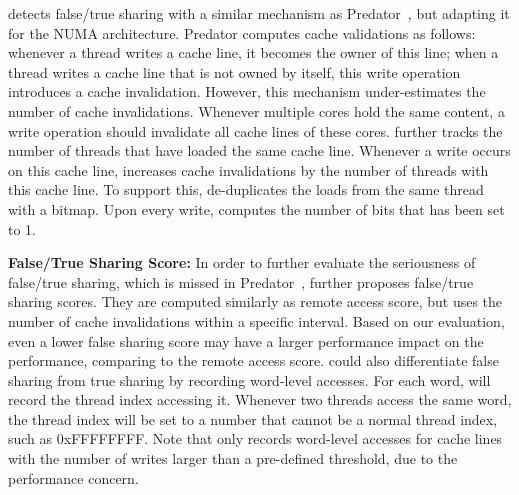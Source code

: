 \NP{} detects false/true sharing with a similar mechanism as Predator~\cite{Predator}, but adapting it for the NUMA architecture. Predator computes cache validations as follows: whenever a thread writes a cache line, it becomes the owner of this line; when a thread writes a cache line that is not owned by itself, this write operation introduces a cache invalidation. However, this mechanism under-estimates the number of cache invalidations. Whenever multiple cores hold the same content, a write operation should invalidate all cache lines of these cores. \NP{} further tracks the number of threads that have loaded the same cache line. Whenever a write occurs on this cache line, \NP{} increases cache invalidations by the number of threads with this cache line. To support this, \NP{} de-duplicates the loads from the same thread with a bitmap. Upon every write, \NP{} computes the number of bits that has been set to 1. 

\textbf{False/True Sharing Score:} In order to further evaluate the seriousness of false/true sharing, which is missed in Predator~\cite{Predator}, \NP{} further proposes false/true sharing scores. They are computed similarly as remote access score, but uses the number of cache invalidations within a specific interval. Based on our evaluation, even a lower false sharing score may have a larger performance impact on the performance, comparing to the remote access score. \NP{} could also differentiate false sharing from true sharing by recording word-level accesses. For each word, \NP{} will record the thread index accessing it. Whenever two threads access the same word, the thread index will be set to a number that cannot be a normal thread index, such as 0xFFFFFFFF. Note that \NP{} only records word-level accesses for cache lines with the number of writes larger than a pre-defined threshold, due to the performance concern. 



